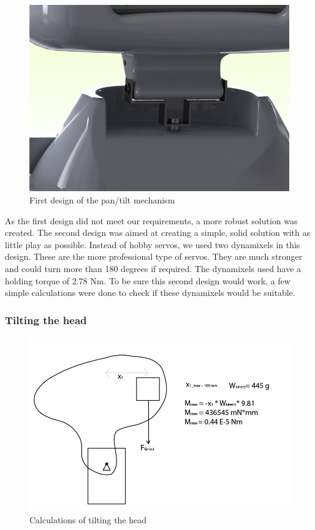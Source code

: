 \documentclass[technical_document.tex]{subfiles}
\begin{document}
\begin{figure}[ht!]
	\centering
	\mbox{\includegraphics[scale=0.3]{Images/neck_old.jpg}}
	\caption{First design of the pan/tilt mechanism}
	\label{fig:neck_old}
\end{figure}

As the first design did not meet our requirements, a more robust solution was created. The second design was aimed at creating a simple, solid solution with as little play as possible. Instead of hobby servos, we used two dynamixels in this design. These are the more professional type of servos. They are much stronger and could turn more than 180 degrees if required. The dynamixels used have a holding torque of 2.78 Nm. To be sure this second design would work, a few simple calculations were done to check if these dynamixels would be suitable.

\subsubsection{Tilting the head}

\begin{figure}[ht!]
	\centering
	\mbox{\includegraphics[scale=0.4]{Images/head_tilt.png}}
	\caption{Calculations of tilting the head}
	\label{fig:head_tilt}
\end{figure}
\end{document}
